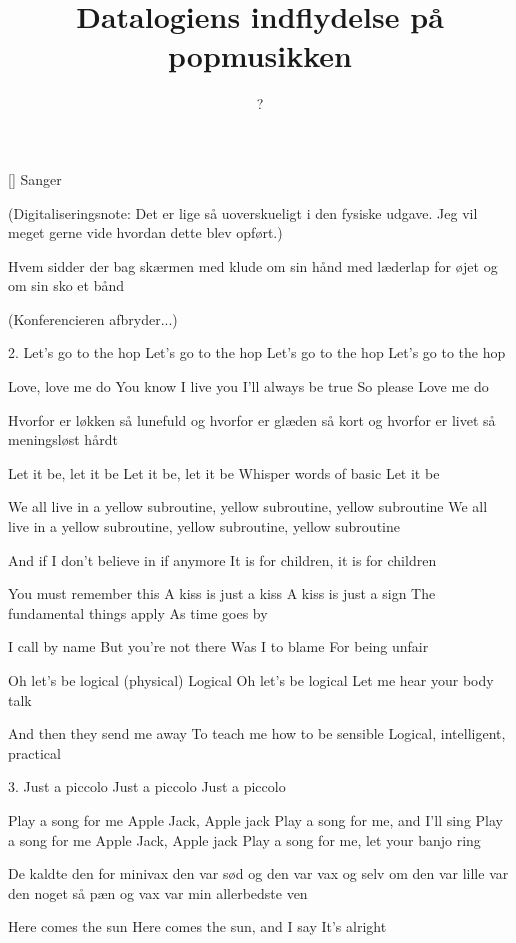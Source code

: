 \documentclass[a4paper,11pt]{article}
\title{Datalogiens indflydelse på popmusikken}
\author{?}
\begin{document}
\maketitle

\begin{roles}
  [] Sanger
\end{roles}

(Digitaliseringsnote: Det er lige så uoverskueligt i den fysiske
udgave.  Jeg vil meget gerne vide hvordan dette blev opført.)

\begin{song}
  Hvem sidder der bag skærmen
  med klude om sin hånd
  med læderlap for øjet og om sin sko et bånd

  (Konferencieren afbryder...)

2.
Let's go to the hop
Let's go to the hop
Let's go to the hop
Let's go to the hop

Love, love me do
You know I live you
I'll always be true
So please
Love me do

Hvorfor er løkken så lunefuld
og hvorfor er glæden så kort
og hvorfor er livet
så meningsløst hårdt

Let it be, let it be
Let it be, let it be
Whisper words of basic
Let it be

We all live in a yellow subroutine, yellow subroutine, yellow subroutine
We all live in a yellow subroutine, yellow subroutine, yellow subroutine

And if I don't believe in if anymore
It is for children, it is for children

You must remember this
A kiss is just a kiss
A kiss is just a sign
The fundamental things apply
As time goes by

I call by name
But you're not there
Was I to blame
For being unfair

Oh let's be logical (physical)
Logical
Oh let's be logical
Let me hear your body talk

And then they send me away
To teach me how to be sensible
Logical, intelligent, practical

3.
Just a piccolo
Just a piccolo
Just a piccolo

Play a song for me Apple Jack, Apple jack
Play a song for me, and I'll sing
Play a song for me Apple Jack, Apple jack
Play a song for me, let your banjo ring

De kaldte den for minivax
den var sød og den var vax
og selv om den var lille
var den noget så pæn
og vax var min allerbedste ven

Here comes the sun
Here comes the sun, and I say
It's alright


\end{song}
\end{document}
